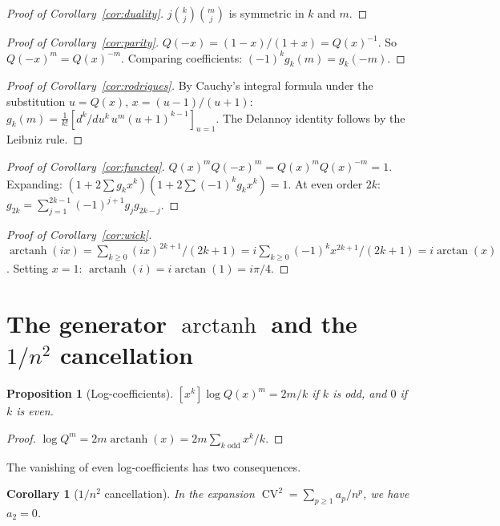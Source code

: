 \documentclass[11pt]{amsart}
\newtheorem{proposition}[theorem]{Proposition}
\newtheorem{corollary}[theorem]{Corollary}
\theoremstyle{definition}
\DeclareMathOperator{\CV}{CV}
\DeclareMathOperator{\arctanh}{arctanh}
\DeclareMathOperator{\arctan}{arctan}
\begin{document}
\begin{proof}[Proof of Corollary~\ref{cor:duality}]
$j\binom{k}{j}\binom{m}{j}$ is symmetric in $k$ and $m$.
\end{proof}

\begin{proof}[Proof of Corollary~\ref{cor:parity}]
$Q(-x) = (1-x)/(1+x) = Q(x)^{-1}$. So $Q(-x)^m = Q(x)^{-m}$. Comparing coefficients: $(-1)^k g_k(m) = g_k(-m)$.
\end{proof}

\begin{proof}[Proof of Corollary~\ref{cor:rodrigues}]
By Cauchy's integral formula under the substitution $u = Q(x)$, $x = (u-1)/(u+1)$: $g_k(m) = \frac{1}{k!}[d^k/du^k\,u^m(u+1)^{k-1}]_{u=1}$. The Delannoy identity follows by the Leibniz rule.
\end{proof}

\begin{proof}[Proof of Corollary~\ref{cor:functeq}]
$Q(x)^m Q(-x)^m = Q(x)^m Q(x)^{-m} = 1$. Expanding: $(1 + 2\sum g_k x^k)(1 + 2\sum (-1)^k g_k x^k) = 1$. At even order $2k$: $g_{2k} = \sum_{j=1}^{2k-1}(-1)^{j+1}g_j g_{2k-j}$.
\end{proof}

\begin{proof}[Proof of Corollary~\ref{cor:wick}]
$\arctanh(ix) = \sum_{k \geq 0}(ix)^{2k+1}/(2k+1) = i\sum_{k \geq 0}(-1)^k x^{2k+1}/(2k+1) = i\arctan(x)$. Setting $x = 1$: $\arctanh(i) = i\arctan(1) = i\pi/4$.
\end{proof}

\section{The generator $\arctanh$ and the $1/n^2$ cancellation}

\begin{proposition}[Log-coefficients]\label{prop:log}
$[x^k]\log Q(x)^m = 2m/k$ if $k$ is odd, and $0$ if $k$ is even.
\end{proposition}

\begin{proof}
$\log Q^m = 2m\arctanh(x) = 2m\sum_{k \text{ odd}} x^k/k$.
\end{proof}

The vanishing of even log-coefficients has two consequences.

\begin{corollary}[$1/n^2$ cancellation]\label{cor:cancel}
In the expansion $\CV^2 = \sum_{p \geq 1} a_p/n^p$, we have $a_2 = 0$.
\end{corollary}
\end{document}
